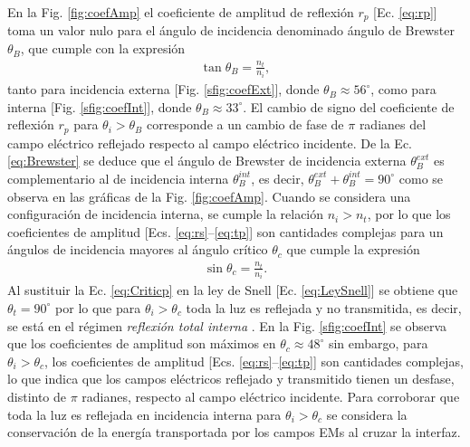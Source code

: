 En la Fig. \ref{fig:coefAmp} el coeficiente de amplitud de reflexión $r_p$ [Ec. \eqref{eq:rp}] toma un valor nulo para el ángulo de incidencia  denominado ángulo de Brewster $\theta_B$, que cumple con la expresión 
%
	\begin{align}
	\tan\theta_B = \frac{n_t}{n_i},
	\label{eq:Brewster}
	\end{align}
%	
tanto para incidencia externa [Fig. \ref{sfig:coefExt}], donde $\theta_B \approx 56^\circ$, como para interna [Fig. \ref{sfig:coefInt}], donde $\theta_B \approx 33^\circ$. El cambio de signo del coeficiente de reflexión $r_p$ para $\theta_i>\theta_B$ corresponde a un cambio de fase de $\pi$ radianes del campo eléctrico reflejado respecto al campo eléctrico incidente. De la Ec. \eqref{eq:Brewster} se deduce que el ángulo de Brewster de incidencia externa $\theta_B^{ext}$ es complementario al de incidencia interna $\theta_B^{int}$, es decir, $\theta_B^{ext}+\theta_B^{int} = 90^\circ$ como se observa en las gráficas de la Fig. \ref{fig:coefAmp}. Cuando se considera una configuración de incidencia interna, se cumple la relación $n_i>n_t$, por lo que los coeficientes de amplitud  [Ecs. \eqref{eq:rs}--\eqref{eq:tp}] son cantidades complejas para un ángulos de incidencia mayores al ángulo crítico $\theta_c$ que cumple la expresión
% 
	\begin{align}
	\sin\theta_c = \frac{n_t}{n_i}.
	\label{eq:Criticp}
	\end{align}
%
Al sustituir la Ec. \eqref{eq:Criticp} en la ley de Snell [Ec. \eqref{eq:LeySnell}] se obtiene que $\theta_t = 90^\circ$ por lo que para $\theta_i>\theta_c$ toda la luz es reflejada y no transmitida, es decir, se está en el régimen \emph{reflexión total interna} . En la Fig. \ref{sfig:coefInt} se observa que los coeficientes de amplitud son máximos en $\theta_c \approx 48^\circ$ sin embargo, para $\theta_i>\theta_c$, los coeficientes de amplitud  [Ecs. \eqref{eq:rs}--\eqref{eq:tp}] son cantidades complejas, lo que indica que los campos eléctricos reflejado y transmitido tienen un desfase, distinto de $\pi$ radianes, respecto al campo eléctrico incidente.  Para corroborar que toda la luz es reflejada en incidencia interna para $\theta_i>\theta_c$ se considera la conservación de la energía transportada por los campos EMs al cruzar la interfaz.


